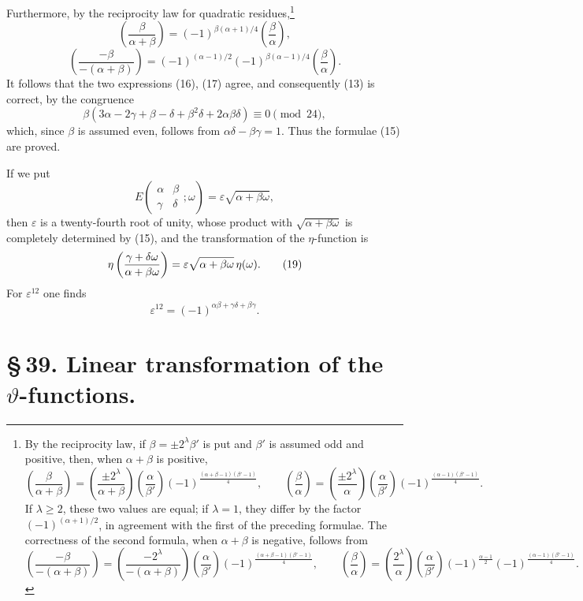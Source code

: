 \documentclass[11pt]{article}
\providecommand{\Jac}[2]{\left(\frac{#1}{#2}\right)}
\begin{document}
Furthermore, by the reciprocity law for quadratic residues,\footnote{By the reciprocity law, if $\beta=\pm2^\lambda\beta'$ is put and $\beta'$ is assumed odd and positive, then, when $\alpha+\beta$ is positive,
\[
\Jac{\beta}{\alpha+\beta}=\Jac{\pm2^\lambda}{\alpha+\beta}\Jac{\alpha}{\beta'}(-1)^{\frac{(\alpha+\beta-1)(\beta'-1)}{4}},
\qquad
\Jac{\beta}{\alpha}=\Jac{\pm2^\lambda}{\alpha}\Jac{\alpha}{\beta'}(-1)^{\frac{(\alpha-1)(\beta'-1)}{4}}.
\]
If $\lambda\ge2$, these two values are equal; if $\lambda=1$, they differ by the factor $(-1)^{(\alpha+1)/2}$, in agreement with the first of the preceding formulae. The correctness of the second formula, when $\alpha+\beta$ is negative, follows from
\[
\Jac{-\beta}{-(\alpha+\beta)}=\Jac{-2^\lambda}{-(\alpha+\beta)}\Jac{\alpha}{\beta'}(-1)^{\frac{(\alpha+\beta-1)(\beta'-1)}{4}},
\qquad
\Jac{\beta}{\alpha}=\Jac{2^\lambda}{\alpha}\Jac{\alpha}{\beta'}(-1)^{\frac{\alpha-1}{2}}(-1)^{\frac{(\alpha-1)(\beta'-1)}{4}}.
\]
}
\[
\Jac{\beta}{\alpha+\beta}=(-1)^{\beta(\alpha+1)/4}\Jac{\beta}{\alpha},
\]
\[
\Jac{-\beta}{-(\alpha+\beta)}=(-1)^{(\alpha-1)/2}(-1)^{\beta(\alpha-1)/4}\Jac{\beta}{\alpha}.
\]
It follows that the two expressions (16), (17) agree, and consequently (13) is correct, by the congruence
\[
\beta(3\alpha-2\gamma+\beta-\delta+\beta^2\delta+2\alpha\beta\delta)
\equiv0\pmod{24},
\]
which, since $\beta$ is assumed even, follows from $\alpha\delta-\beta\gamma=1$. Thus the formulae (15) are proved.

If we put
\begin{equation}
E\left(\begin{matrix}\alpha&\beta\\\gamma&\delta\end{matrix};\omega\right)
=\varepsilon\sqrt{\alpha+\beta\omega},
\tag{18}
\end{equation}
then $\varepsilon$ is a twenty-fourth root of unity, whose product with $\sqrt{\alpha+\beta\omega}$ is completely determined by (15), and the transformation of the $\eta$-function is
\begin{equation}
\eta\left({\gamma+\delta\omega\over\alpha+\beta\omega}\right)
=\varepsilon\sqrt{\alpha+\beta\omega}\,\eta(\omega).
\tag{19}
\end{equation}
For $\varepsilon^{12}$ one finds
\begin{equation}
\varepsilon^{12}=(-1)^{\alpha\beta+\gamma\delta+\beta\gamma}. 
\tag{20}
\end{equation}

\section*{\S\,39. Linear transformation of the $\vartheta$-functions.}
\end{document}
